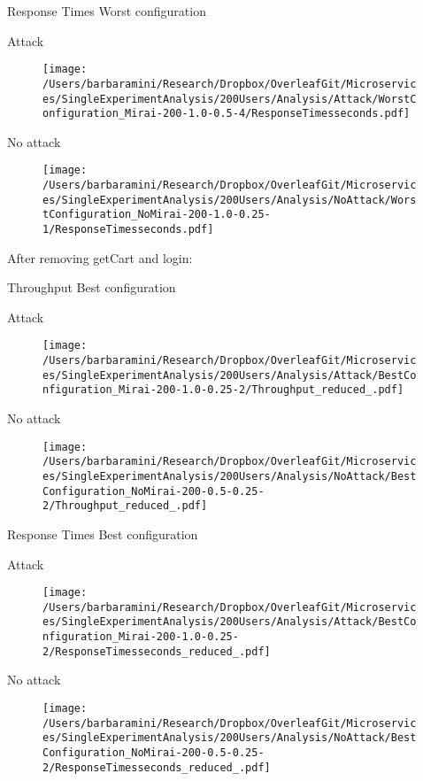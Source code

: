 \documentclass[10pt]{article}
\begin{document}
\break
Response Times Worst configuration \par
Attack 

\begin{figure}[h]
\texttt{[image: /Users/barbaramini/Research/Dropbox/OverleafGit/Microservices/SingleExperimentAnalysis/200Users/Analysis/Attack/WorstConfiguration\_Mirai-200-1.0-0.5-4/ResponseTimesseconds.pdf]}
\end{figure}
No attack
\begin{figure}[h]
\texttt{[image: /Users/barbaramini/Research/Dropbox/OverleafGit/Microservices/SingleExperimentAnalysis/200Users/Analysis/NoAttack/WorstConfiguration\_NoMirai-200-1.0-0.25-1/ResponseTimesseconds.pdf]}
\end{figure}

\break
After removing  getCart and login:\par

Throughput Best configuration \par
Attack \par
\begin{figure}[h]
\texttt{[image: /Users/barbaramini/Research/Dropbox/OverleafGit/Microservices/SingleExperimentAnalysis/200Users/Analysis/Attack/BestConfiguration\_Mirai-200-1.0-0.25-2/Throughput\_reduced\_.pdf]}
\end{figure}
No attack 
\begin{figure}[h]
\texttt{[image: /Users/barbaramini/Research/Dropbox/OverleafGit/Microservices/SingleExperimentAnalysis/200Users/Analysis/NoAttack/BestConfiguration\_NoMirai-200-0.5-0.25-2/Throughput\_reduced\_.pdf]}
\end{figure}

\break
Response Times Best configuration \par
Attack\par
\begin{figure}[h]
\texttt{[image: /Users/barbaramini/Research/Dropbox/OverleafGit/Microservices/SingleExperimentAnalysis/200Users/Analysis/Attack/BestConfiguration\_Mirai-200-1.0-0.25-2/ResponseTimesseconds\_reduced\_.pdf]}
\end{figure}
No attack
\begin{figure}[h]
\texttt{[image: /Users/barbaramini/Research/Dropbox/OverleafGit/Microservices/SingleExperimentAnalysis/200Users/Analysis/NoAttack/BestConfiguration\_NoMirai-200-0.5-0.25-2/ResponseTimesseconds\_reduced\_.pdf]}
\end{figure}
\end{document}

